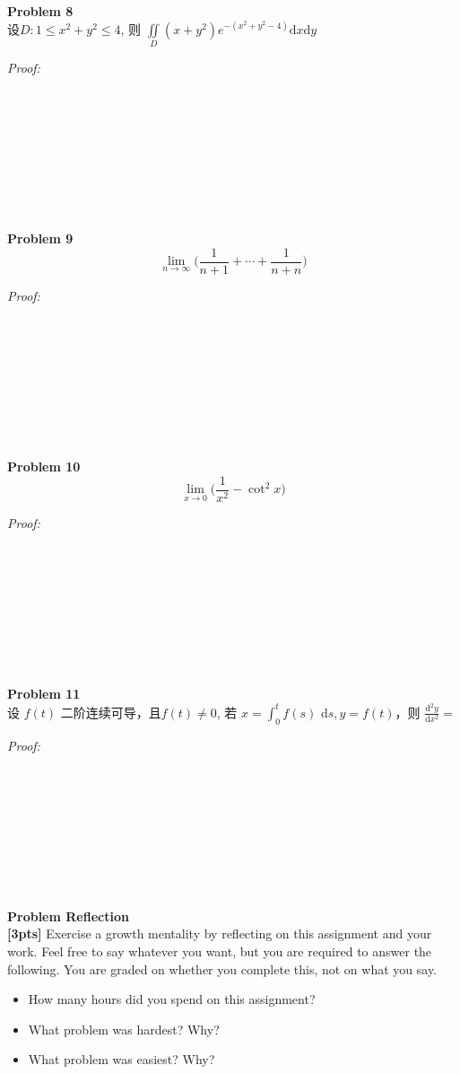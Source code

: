 \documentclass[]{article}
\newenvironment{problem}[2][Problem]
    { \begin{mdframed}[backgroundcolor=gray!20] \textbf{#1 #2} \\}
    {  \end{mdframed}}
\newenvironment{solution}
    {\textit{Proof:}}
    {\\ \\ \\ \\ \\ \\ \\ \\ \\}
\begin{document}
\begin{problem}{8}
     设$ D: 1 \le x^2 + y^2 \le 4 $, 则 $ \displaystyle{\iint \limits_{D} (x + y^2)e^{-(x^2 + y^2 - 4) 
    } \mathrm{d}x \mathrm{d}y }$
\end{problem}
\begin{solution}
\end{solution}

\begin{problem}{9}
     \begin{displaymath}
        \lim_{n \to \infty} \Biggl( \frac{1}{n + 1} + \cdots + \frac{1}{n+n} \Biggr)
     \end{displaymath}
\end{problem}
\begin{solution}
\end{solution}

\begin{problem}{10}
     \begin{displaymath}
        \lim_{x \to 0} \biggl( \frac{1}{x^2} - \cot ^2 x \biggr)
     \end{displaymath}
\end{problem}
\begin{solution}
\end{solution}

\begin{problem}{11}
     设 $f(t)$ 二阶连续可导，且$ f(t) \neq 0 $, 若 $\displaystyle{ 
        x = \int_{0}^{t} f(s) \, \, \mathrm{d}s, y = f(t) 
      }$，则 $ \displaystyle{ \frac{\mathrm{d}^2 y}{\mathrm{d} x^2} =} $
\end{problem}
\begin{solution}
\end{solution}



\begin{problem}{Reflection}
\textbf{[3pts]} Exercise a growth mentality by reflecting on this assignment and your work. Feel free to say whatever you want, but you are required to answer the following. You are graded on whether you complete this, not on what you say.
\begin{itemize}
\item How many hours did you spend on this assignment?
\item What problem was hardest? Why?
\item What problem was easiest? Why?
\end{itemize}
\end{problem}
\end{document}
